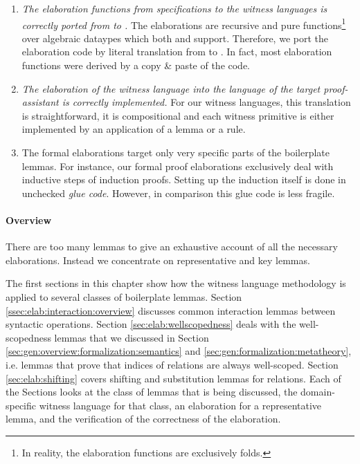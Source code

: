 \begin{enumerate}
\item \emph{The elaboration functions from \Knot specifications to the witness
  languages is correctly ported from \Coq to \Haskell.} The elaborations are
  recursive and pure functions\footnote{In reality, the elaboration functions
    are exclusively folds.} over algebraic dataypes which both \Coq and \Haskell
  support. Therefore, we port the elaboration code by literal translation from
  \Coq to \Haskell. In fact, most \Haskell elaboration functions were derived by
  a copy \& paste of the \Coq code.

\item \emph{The elaboration of the witness language into the language of the
  target proof-assistant is correctly implemented.} For our witness languages,
  this translation is straightforward, it is compositional and each witness
  primitive is either implemented by an application of a lemma or a rule.

\item The formal elaborations target only very specific parts of the boilerplate
  lemmas. For instance, our formal proof elaborations exclusively deal with
  inductive steps of induction proofs. Setting up the induction itself is done
  in unchecked \emph{glue code}. However, in comparison this glue code is less
  fragile.
\end{enumerate}



\paragraph{Overview}

There are too many lemmas to give an exhaustive account of all the
necessary elaborations. Instead we concentrate on representative and key lemmas.

The first sections in this chapter show how the witness language methodology is
applied to several classes of boilerplate lemmas. Section
\ref{ssec:elab:interaction:overview} discusses common interaction lemmas between
syntactic operations. Section \ref{sec:elab:wellscopedness} deals with the
well-scopedness lemmas that we discussed in Section
\ref{sec:gen:overview:formalization:semantics} and
\ref{sec:gen:formalization:metatheory}, i.e. lemmas that prove that indices of
relations are always well-scoped. Section \ref{sec:elab:shifting} covers
shifting and substitution lemmas for relations. Each of the Sections looks at
the class of lemmas that is being discussed, the domain-specific witness
language for that class, an elaboration for a representative lemma, and the
verification of the correctness of the elaboration.

